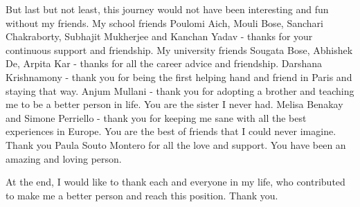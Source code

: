 But last but not least, this journey would not have been interesting and fun without my friends. My school friends  Poulomi Aich, Mouli Bose, Sanchari Chakraborty, Subhajit Mukherjee and Kanchan Yadav - thanks for your continuous support and friendship. My university friends Sougata Bose, Abhishek De, Arpita Kar - thanks for all the career advice and friendship. Darshana Krishnamony - thank you for being the first helping hand and friend in Paris and staying that way.  Anjum Mullani - thank you for adopting a brother and teaching me to be a better person in life. You are the sister I never had. Melisa Benakay and Simone Perriello - thank you for keeping me sane with all the best experiences in Europe. You are the best of friends that I could never imagine. Thank you Paula Souto Montero for all the love and support. You have been an amazing and loving person.

At the end, I would like to thank each and everyone in my life, who contributed to make me a better person and reach this position. Thank you.